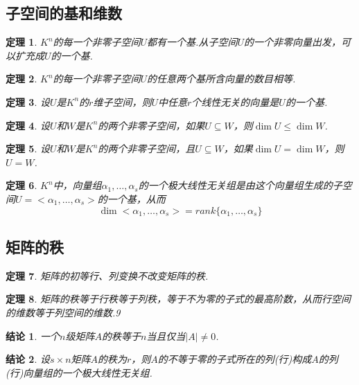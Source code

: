 \documentclass[UTF8]{article}
\newtheorem{thrm}{定理}[subsection]
\newtheorem{ccl}{结论}[subsection]
\begin{document}
\subsection{子空间的基和维数}
\begin{thrm}
  $K^n$的每一个非零子空间$U$都有一个基.从子空间$U$的一个非零向量出发，可以扩充成$U$的一个基.
\end{thrm}
\begin{thrm}
  $K^n$的每一个非零子空间$U$的任意两个基所含向量的数目相等.
\end{thrm}
\begin{thrm}
  设$U$是$K^n$的$r$维子空间，则$U$中任意$r$个线性无关的向量是$U$的一个基.
\end{thrm}
\begin{thrm}
  设$U$和$W$是$K^n$的两个非零子空间，如果$U\subseteq W$，则$\dim U\le \dim W$.
\end{thrm}
\begin{thrm}
  设$U$和$W$是$K^n$的两个非零子空间，且$U\subseteq W$，如果$\dim U= \dim W$，则$U=W$.
\end{thrm}
\begin{thrm}
  $K^n$中，向量组$\alpha_1,\ldots,\alpha_s$的一个极大线性无关组是由这个向量组生成的子空间$U = <\alpha_1,\ldots,\alpha_s>$的一个基，从而
  $$\dim<\alpha_1,\ldots,\alpha_s>=rank\{\alpha_1,\ldots,\alpha_s\}$$
\end{thrm}

\subsection{矩阵的秩}
\begin{thrm}
  矩阵的初等行、列变换不改变矩阵的秩.
\end{thrm}
\begin{thrm}
  矩阵的秩等于行秩等于列秩，等于不为零的子式的最高阶数，从而行空间的维数等于列空间的维数.9
\end{thrm}
\begin{ccl}
  一个$n$级矩阵$A$的秩等于$n$当且仅当$|A| \ne 0$.
\end{ccl}
\begin{ccl}
  设$s\times n$矩阵$A$的秩为$r$，则$A$的不等于零的子式所在的列(行)构成$A$的列(行)向量组的一个极大线性无关组.
\end{ccl}
\end{document}
